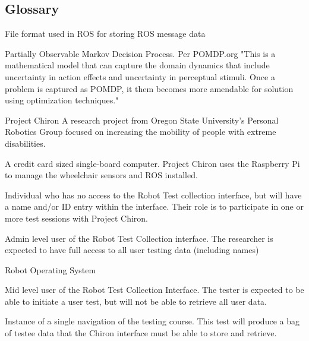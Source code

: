 \documentclass[onecolumn, draftclsnofoot,10pt, compsoc]{report}
\begin{document}
\subsection{Glossary}
\begin{description}
	\item [Bag] \hfill \break File format used in ROS for storing ROS message data
	\item [POMDP] \hfill \break Partially Observable Markov Decision Process. Per POMDP.org "This is a mathematical model that can capture the domain dynamics that include uncertainty in action effects and uncertainty in perceptual stimuli. Once a problem is captured as POMDP, it them becomes more amendable for solution using optimization techniques."  \cite{POMDP}
	\item Project Chiron \hfill \break A research project from Oregon State University's Personal Robotics Group focused on increasing the mobility of people with extreme disabilities\cite{Chiron}. 
	\item [Raspberry Pi] \hfill \break A credit card sized single-board computer. Project Chiron uses the Raspberry Pi to manage the wheelchair sensors and ROS installed.
	\item [Research Participant] \hfill \break Individual who has no access to the Robot Test collection interface, but will have a name and/or ID entry within the interface. Their role is to participate in one or more test sessions with Project Chiron.
	\item [Researcher] \hfill \break Admin level user of the Robot Test Collection interface. The researcher is expected to have full access to all user testing data (including names)
	\item [ROS] \hfill \break Robot Operating System
	\item [Tester] \hfil \break Mid level user of the Robot Test Collection Interface. The tester is expected to be able to initiate a user test, but will not be able to retrieve all user data.
	\item [User Test] \hfill \break Instance of a single navigation of the testing course. This test will produce a bag of testee data that the Chiron interface must be able to store and retrieve.
	
\end{description}
\end{document}

